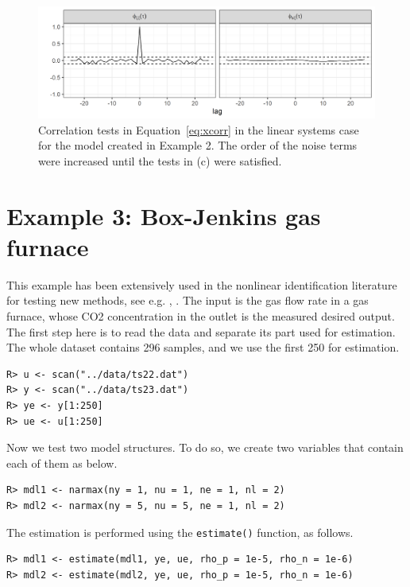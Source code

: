 \documentclass[preprint,12pt, a4paper]{elsarticle}
\begin{document}
\begin{figure}[h!]
	\centering
	\includegraphics[width=15cm,keepaspectratio]{ex2xc}
	\caption{Correlation tests in Equation~\ref{eq:xcorr} in the linear systems case for the model created in Example 2. The order of the noise terms were increased until the tests in (c) were satisfied.} \label{fig:ex2c}
\end{figure}

\section{Example 3: Box-Jenkins gas furnace}

This example has been extensively used in the nonlinear identification literature for testing new methods, see e.g. \cite{Sugeno93}, \cite{AYALA2016378}. The input is the gas flow rate in a gas furnace, whose CO2 concentration in the outlet is the measured desired output. The first step here is to read the data and separate its part used for estimation. The whole dataset contains 296 samples, and we use the first 250 for estimation.

\begin{verbatim}
R> u <- scan("../data/ts22.dat")
R> y <- scan("../data/ts23.dat")
R> ye <- y[1:250]
R> ue <- u[1:250]
\end{verbatim}

Now we test two model structures. To do so, we create two variables that contain each of them as below.

\begin{verbatim}
R> mdl1 <- narmax(ny = 1, nu = 1, ne = 1, nl = 2)
R> mdl2 <- narmax(ny = 5, nu = 5, ne = 1, nl = 2)
\end{verbatim}

The estimation is performed using the \verb|estimate()| function, as follows.

\begin{verbatim}
R> mdl1 <- estimate(mdl1, ye, ue, rho_p = 1e-5, rho_n = 1e-6)
R> mdl2 <- estimate(mdl2, ye, ue, rho_p = 1e-5, rho_n = 1e-6)
\end{verbatim}
\end{document}
